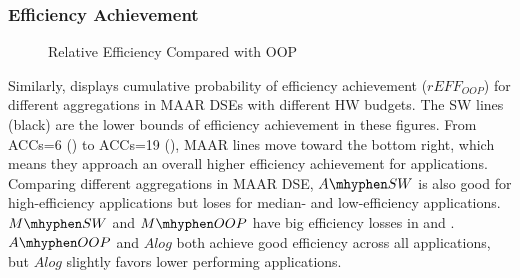 
\subsubsection{Efficiency Achievement}
\label{subsubsec:agg-oop}


\begin{figure*}[h]
\vspace{-10pt}
	\centering
		\hfill
		\hfill
		\vspace{-8pt}
	\caption{Relative Efficiency Compared with OOP}
	\label{fig:OpenVXoop}
\end{figure*}


Similarly,  displays cumulative probability of efficiency achievement ($rEFF_{OOP}$) for different aggregations in MAAR DSEs with different HW budgets. The SW lines (black) are the lower bounds of efficiency achievement in these figures. 
From ACCs=6 () to ACCs=19 (), MAAR lines move toward the bottom right, which means they approach an overall higher efficiency achievement for applications. Comparing different aggregations in MAAR DSE, $A\mhyphen SW$ is also good for high-efficiency applications but loses for median- and low-efficiency applications. 
$M\mhyphen SW$ and $M\mhyphen OOP$ have big efficiency losses in  and . 
$A\mhyphen OOP$ and $Alog$ both achieve good efficiency across all applications, but $Alog$ slightly favors lower performing applications. 
